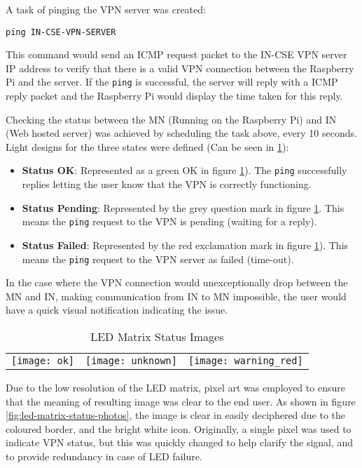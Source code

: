 A task of pinging the VPN server was created:\\

\begin{lstlisting}
ping IN-CSE-VPN-SERVER
\end{lstlisting}

This command would send an ICMP request packet to the IN-CSE VPN server IP address to verify that there is a valid VPN connection between the Raspberry Pi and the server. If the \lstinline{ping} is successful, the server will reply with a ICMP reply packet and the Raspberry Pi would display the time taken for this reply.   

Checking the status between the MN (Running on the Raspberry Pi) and IN (Web hosted server) was achieved by scheduling the task above, every 10 seconds. Light designs for the three states were defined (Can be seen in \ref{fig:led-matrix-status-images}):

\begin{itemize}
\item \textbf{Status OK}: Represented as a green OK in figure \ref{fig:led-matrix-status-images}). The \lstinline{ping} successfully replies letting the user know that the VPN is correctly functioning.
\item \textbf{Status Pending}: Represented by the grey question mark in figure \ref{fig:led-matrix-status-images}. This means the \lstinline{ping} request to the VPN is pending (waiting for a reply).
\item \textbf{Status Failed}: Represented by the red exclamation mark in figure \ref{fig:led-matrix-status-images}). This means the \lstinline{ping} request to the VPN server as failed (time-out).
\end{itemize}

In the case where the VPN connection would unexceptionally drop between the MN and IN, making communication from IN to MN impossible, the user would have a quick visual notification indicating the issue.   

\begin{table}[H]
\centering
\begin{tabular}{l|l|l}
\texttt{[image: ok]}&\texttt{[image: unknown]}&\texttt{[image: warning\_red]}\\
\end{tabular}
\caption{LED Matrix Status Images}
\label{fig:led-matrix-status-images}
\end{table}

Due to the low resolution of the LED matrix, pixel art was employed to ensure that the meaning of resulting image was clear to the end user. As shown in figure \ref{fig:led-matrix-status-photos}, the image is clear in easily deciphered due to the coloured border, and the bright white icon. Originally, a single pixel was used to indicate VPN status, but this was quickly changed to help clarify the signal, and to provide redundancy in case of LED failure.

